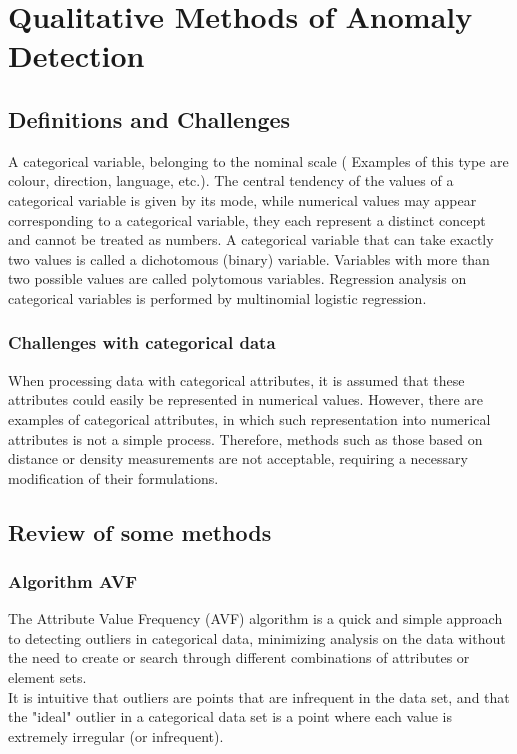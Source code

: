 \section{Qualitative Methods of Anomaly Detection}\label{Section:3}
%
\subsection{Definitions and Challenges}
%
A categorical variable, belonging to the nominal scale ( Examples of this type are colour, direction, language, etc.). 
The central tendency of the values of a categorical variable is given by its mode, while numerical values may appear corresponding to a categorical variable, they each represent a distinct concept and cannot be treated as numbers. 
A categorical variable that can take exactly two values is called a dichotomous (binary) variable. Variables with more than two possible values are called polytomous variables. Regression analysis on categorical variables is performed by multinomial logistic regression.



\subsubsection*{Challenges with categorical data}
When processing data with categorical attributes, it is assumed that these attributes could easily be represented in numerical values. However, there are examples of categorical attributes, in which such representation into numerical attributes is not a simple process. Therefore, methods such as those based on distance or density measurements are not acceptable, requiring a necessary modification of their formulations.

\subsection{Review of some methods}
\subsubsection*{Algorithm AVF}
The Attribute Value Frequency (AVF) algorithm is a quick and simple approach to detecting outliers in categorical data, minimizing analysis on the data without the need to create or search through different combinations of attributes or element sets.  \\

\noindent It is intuitive that outliers are points that are infrequent in the data set, and that the "ideal" outlier in a categorical data set is a point where each value is extremely irregular (or infrequent). \\


